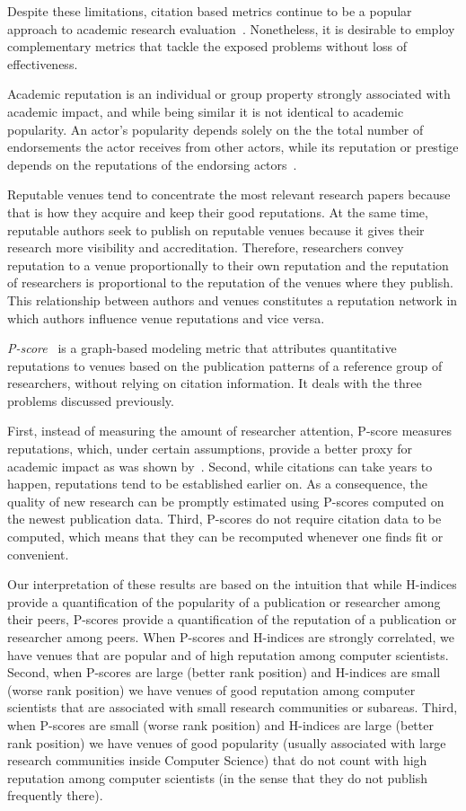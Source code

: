 \documentclass[man]{apa6}
\let \citeA \textcite
\let \cite \parencite
\begin{document}
Despite these limitations, citation based metrics continue to be a popular approach to
academic research evaluation~\cite{Kellner2008}.
Nonetheless, it is desirable to employ
complementary metrics that tackle the exposed problems without loss of effectiveness.

Academic reputation is an individual or group property strongly associated with 
academic impact, and while being similar it is not identical to academic popularity. An 
actor's popularity depends solely on the the total number of endorsements
the actor receives from other actors, while its reputation or prestige depends on the 
reputations of the endorsing actors~\cite{Bollen2006}.

Reputable venues tend to concentrate the most relevant research papers 
because that is how they acquire and keep their good reputations. At the same time, 
reputable authors seek to publish on reputable venues because it gives their 
research more visibility and accreditation. Therefore, researchers convey reputation
to a venue proportionally to their own reputation and the reputation of researchers
is proportional to the reputation of the venues where they publish.
This relationship between authors and venues constitutes a reputation network in which 
authors influence venue reputations and vice versa. 

{\em P-score}~\cite{Ribas2015a} is a graph-based modeling metric that attributes quantitative
reputations to venues based on the publication patterns of a reference group of researchers,
without relying on citation information. It deals with the three problems discussed previously. 

First, instead of measuring the amount of researcher attention, P-score measures reputations,
which, under certain assumptions, provide a better proxy for academic impact as was shown by~\citeA{Ribas2015a}. Second, while citations can take years to happen, reputations 
tend to be established earlier on. As a consequence, the quality of new research can be 
promptly estimated using P-scores computed on the newest publication data. Third, P-scores do
not require citation data to be computed, which means that they can be recomputed whenever
one finds fit or convenient.

Our interpretation of these results are based on the intuition that while H-indices provide a 
quantification of the popularity of a publication or researcher among their peers, P-scores 
provide a quantification of the reputation of a publication or researcher among peers. When
P-scores and H-indices are strongly correlated, we have venues that are popular and of high
reputation among computer scientists. Second, when P-scores are large (better rank position) 
and H-indices are small (worse rank position) we have venues of good reputation among computer
scientists that are associated with small research communities or subareas. Third, when P-scores
are small (worse rank position) and H-indices are large (better rank position) we have venues of good popularity 
(usually associated with large research communities inside Computer Science) that do not count
with high reputation among computer scientists (in the sense that they do not publish frequently 
there).
\end{document}
